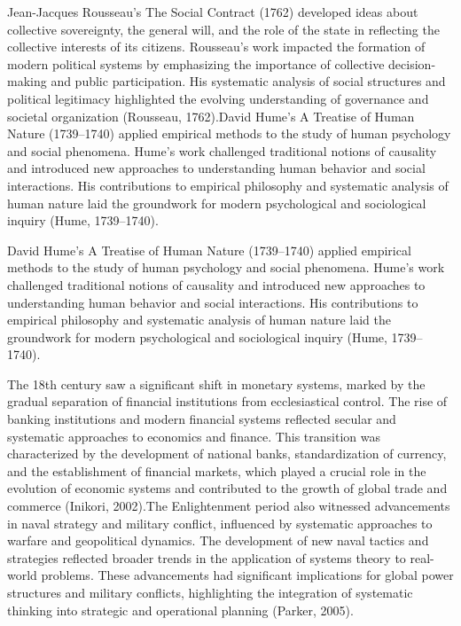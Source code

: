 \documentclass[twocolumn]{article}
\begin{document}
\textcolor{primary}{Jean-Jacques Rousseau’s The Social Contract (1762) developed ideas about collective sovereignty, the general will, and the role of the state in reflecting the collective interests of its citizens. Rousseau’s work impacted the formation of modern political systems by emphasizing the importance of collective decision-making and public participation. His systematic analysis of social structures and political legitimacy highlighted the evolving understanding of governance and societal organization (Rousseau, 1762).David Hume’s A Treatise of Human Nature (1739–1740) applied empirical methods to the study of human psychology and social phenomena. Hume’s work challenged traditional notions of causality and introduced new approaches to understanding human behavior and social interactions. His contributions to empirical philosophy and systematic analysis of human nature laid the groundwork for modern psychological and sociological inquiry (Hume, 1739–1740).}


\textcolor{secondary}{David Hume’s A Treatise of Human Nature (1739–1740) applied empirical methods to the study of human psychology and social phenomena. Hume’s work challenged traditional notions of causality and introduced new approaches to understanding human behavior and social interactions. His contributions to empirical philosophy and systematic analysis of human nature laid the groundwork for modern psychological and sociological inquiry (Hume, 1739–1740).}



\textcolor{primary}{The 18th century saw a significant shift in monetary systems, marked by the gradual separation of financial institutions from ecclesiastical control. The rise of banking institutions and modern financial systems reflected secular and systematic approaches to economics and finance. This transition was characterized by the development of national banks, standardization of currency, and the establishment of financial markets, which played a crucial role in the evolution of economic systems and contributed to the growth of global trade and commerce (Inikori, 2002).The Enlightenment period also witnessed advancements in naval strategy and military conflict, influenced by systematic approaches to warfare and geopolitical dynamics. The development of new naval tactics and strategies reflected broader trends in the application of systems theory to real-world problems. These advancements had significant implications for global power structures and military conflicts, highlighting the integration of systematic thinking into strategic and operational planning (Parker, 2005).}
\end{document}
